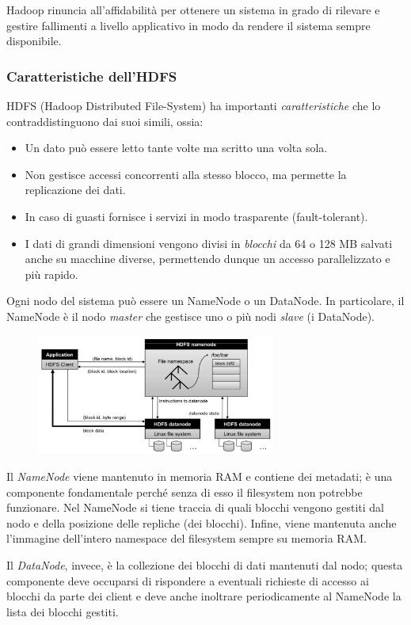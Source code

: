 \documentclass[titlepage]{article}
\begin{document}
Hadoop rinuncia all'affidabilità per ottenere un sistema in grado di rilevare e gestire fallimenti a livello applicativo in modo da rendere il sistema sempre disponibile.

\subsubsection{Caratteristiche dell'HDFS}
HDFS (Hadoop Distributed File-System) ha importanti \textit{caratteristiche} che lo contraddistinguono dai suoi simili, ossia:
\begin{itemize}
    \item Un dato può essere letto tante volte ma scritto una volta sola.
    \item Non gestisce accessi concorrenti alla stesso blocco, ma permette la replicazione dei dati.
    \item In caso di guasti fornisce i servizi in modo trasparente (fault-tolerant).
    \item I dati di grandi dimensioni vengono divisi in \textit{blocchi} da 64 o 128 MB salvati anche su macchine diverse, permettendo dunque un accesso parallelizzato e più rapido.
\end{itemize}
Ogni nodo del sistema può essere un NameNode o un DataNode. In particolare, il NameNode è il nodo \textit{master} che gestisce uno o più nodi \textit{slave} (i DataNode).
\begin{figure}[htp]
	\centering
	\includegraphics[width=0.7\textwidth]{nodi.png}
\end{figure}

Il \textit{NameNode} viene mantenuto in memoria RAM e contiene dei metadati; è una componente fondamentale perché senza di esso il filesystem non potrebbe funzionare. Nel NameNode si tiene traccia di quali blocchi vengono gestiti dal nodo e della posizione delle repliche (dei blocchi). Infine, viene mantenuta anche l'immagine dell'intero namespace del filesystem sempre su memoria RAM.

Il \textit{DataNode}, invece, è la collezione dei blocchi di dati mantenuti dal nodo; questa componente deve occuparsi di rispondere a eventuali richieste di accesso ai blocchi da parte dei client e deve anche inoltrare periodicamente al NameNode la lista dei blocchi gestiti.
\end{document}
